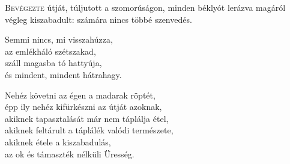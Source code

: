 
\begin{firstdhpverse}{90}
\lettrine{B}{evégezte} {\LettrineTextFont útját, túljutott a szomorúságon,}\newline
minden béklyót lerázva magáról\newline
végleg kiszabadult:\newline
számára nincs többé szenvedés.
\end{firstdhpverse}

\begin{dhpverse}

 Semmi nincs, mi visszahúzza,\\
az emlékháló szétszakad,\\
száll magasba tó hattyúja,\\
és mindent, mindent hátrahagy.

 Nehéz követni az égen a madarak röptét,\\
épp ily nehéz kifürkészni az útját azoknak,\\
akiknek tapasztalását már nem táplálja étel,\\
akiknek feltárult a táplálék valódi természete,\\
akiknek étele a kiszabadulás,\\
az ok és támaszték nélküli Üresség.

\end{dhpverse}
\newpage
